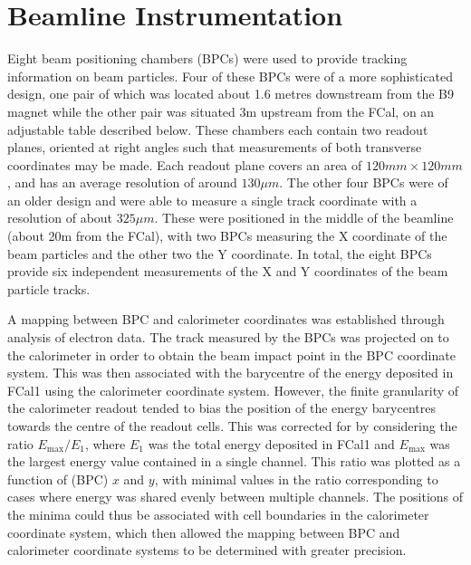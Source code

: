 \section{Beamline Instrumentation}
\label{sec_TBoverview_beamline}
Eight beam positioning chambers (BPCs) were used to provide tracking information on beam particles.
Four of these BPCs were of a more sophisticated design, one pair of which was located about 1.6 metres downstream from the B9 magnet while the other pair was situated 3m upstream from the FCal, on an adjustable table described below. These chambers each contain two readout planes, oriented at right angles such that measurements of both transverse coordinates may be made. Each readout plane covers an area of $120mm \times 120mm$, and has an average resolution of around $130 \mu m$. The other four BPCs were of an older design and were able to measure a single track coordinate with a resolution of about $325 \mu m$. These were positioned in the middle of the beamline (about 20m from the FCal), with two BPCs measuring the X coordinate of the beam particles and the other two the Y coordinate. In total, the eight BPCs provide six independent measurements of the X and Y coordinates of the beam particle tracks.

A mapping between BPC and calorimeter coordinates was established through analysis of electron data. The track measured by the BPCs was projected on to the calorimeter in order to obtain the beam impact point in the BPC coordinate system. This was then associated with the barycentre of the energy deposited in FCal1 using the calorimeter coordinate system. However, the finite granularity of the calorimeter readout tended to bias the position of the energy barycentres towards the centre of the readout cells. This was corrected for by considering the ratio $E_\mathrm{max}/E_1$, where $E_1$ was the total energy deposited in FCal1 and $E_\mathrm{max}$ was the largest energy value contained in a single channel. This ratio was plotted as a function of (BPC) $x$ and $y$, with minimal values in the ratio corresponding to cases where energy was shared evenly between multiple channels. The positions of the minima could thus be associated with cell boundaries in the calorimeter coordinate system, which then allowed the mapping between BPC and calorimeter coordinate systems to be determined with greater precision.
%
%



